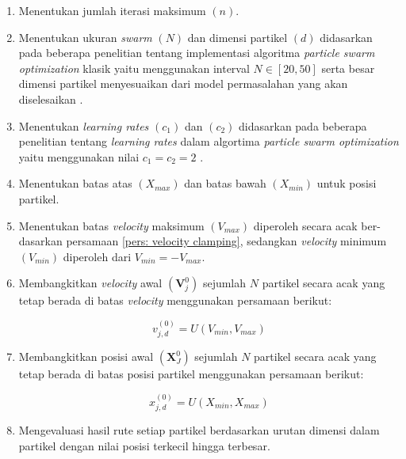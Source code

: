 {{\begin{enumerate}[align = left, left = 0cm, nolistsep]
              \begin{enumerate}[label = (\alph*)., align = left, left = 0mm, nolistsep]
                  \item Menentukan jumlah iterasi maksimum $(n)$.
                  \item Menentukan ukuran \textit{swarm} $(N)$ dan dimensi partikel $(d)$ didasarkan pada beberapa penelitian tentang implementasi algoritma \textit{particle swarm optimization} klasik yaitu menggunakan interval $N\in[20,50]$ serta besar dimensi partikel menyesuaikan dari model permasalahan yang akan diselesaikan .
                  \item Menentukan \textit{learning rates} $(c_{1})$ dan $(c_{2})$ didasarkan pada beberapa penelitian tentang \textit{learning rates} dalam algortima \textit{particle swarm optimization} yaitu menggunakan nilai $c_{1} = c_{2} = 2$ .
                  \item Menentukan batas atas $(X_{max})$ dan batas bawah $(X_{min})$ untuk posisi partikel.
                  \item Menentukan batas \textit{velocity} maksimum $(V_{max})$ diperoleh secara acak ber-dasarkan persamaan \ref{pers: velocity clamping}, sedangkan \textit{velocity} minimum $(V_{min})$ diperoleh dari $V_{min} = - V_{max}$.
                  \item Membangkitkan \textit{velocity} awal $(\boldsymbol{V}_{j}^{0})$ sejumlah $N$ partikel secara acak yang tetap berada di batas \textit{velocity} menggunakan persamaan berikut:

                        \begin{equation}
                            v_{j,d}^{(0)} = U(V_{min},V_{max})
                            \label{pers: bangkitkan velocity awal}
                        \end{equation}

                  \item Membangkitkan posisi awal $(\boldsymbol{X}_{J}^{0})$ sejumlah $N$ partikel secara acak yang tetap berada di batas posisi partikel menggunakan persamaan berikut:

                        \begin{equation}
                            \label{pers: bangkitkan posisi awal}
                            x_{j,d}^{(0)} = U(X_{min},X_{max})
                        \end{equation}

                  \item Mengevaluasi hasil rute setiap partikel berdasarkan urutan dimensi dalam partikel dengan nilai posisi terkecil hingga terbesar.
              \end{enumerate}


\end{enumerate}}}
